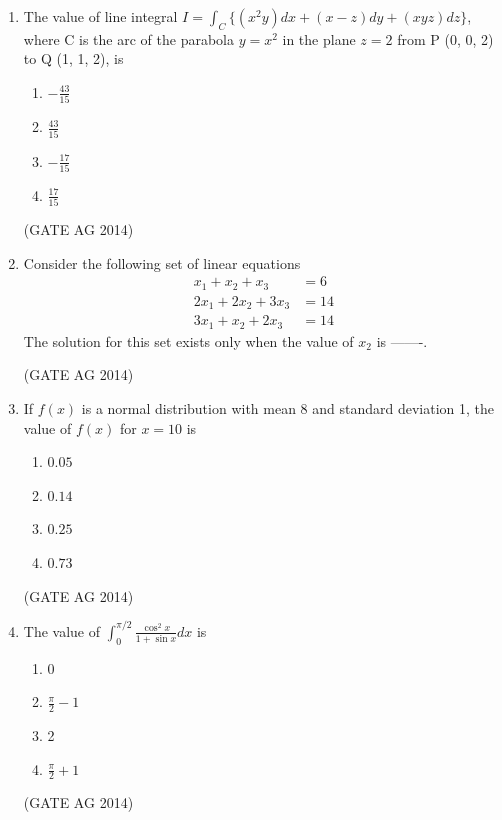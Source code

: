 \documentclass[journal,12pt,onecolumn]{IEEEtran}
\begin{document}
\begin{enumerate}
    \item The value of line integral $I = \int_C \{(x^2 y) dx + (x - z) dy + (xyz) dz\}$, where C is the arc of the parabola $y = x^2$ in the plane $z = 2$ from P (0, 0, 2) to Q (1, 1, 2), is
     \begin{multicols}{4}
    \begin{enumerate}
        \item $-\frac{43}{15}$
        \item $\frac{43}{15}$
        \item $-\frac{17}{15}$
        \item $\frac{17}{15}$
    \end{enumerate}
    \end{multicols}
    \hfill(GATE AG 2014)

    \item Consider the following set of linear equations
    \begin{align*}
        x_1 + x_2 + x_3 &= 6 \\
        2x_1 + 2x_2 + 3x_3 &= 14 \\
        3x_1 + x_2 + 2x_3 &= 14
    \end{align*}
    The solution for this set exists only when the value of $x_2$ is -------.

    \hfill(GATE AG 2014)

    \item If $f(x)$ is a normal distribution with mean 8 and standard deviation 1, the value of $f(x)$ for $x = 10$ is
    \begin{multicols}{4}
    \begin{enumerate}
        \item $0.05$
        \item $0.14$
        \item $0.25$
        \item $0.73$
    \end{enumerate}
    \end{multicols}
    \hfill(GATE AG 2014)

    \item The value of $\int_0^{\pi/2} \frac{\cos^2 x}{1 + \sin x}  dx$ is
     \begin{multicols}{4}
    \begin{enumerate}
        \item 0
        \item $\frac{\pi}{2} - 1$
        \item 2
        \item $\frac{\pi}{2} + 1$
    \end{enumerate}
     \end{multicols}
    \hfill(GATE AG 2014)


\end{enumerate}
\end{document}
